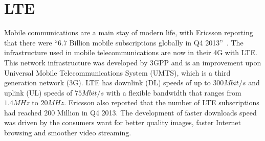 \chapter{LTE}\label{lte}
Mobile communications are a main stay of modern life, with Ericsson reporting that there were ``6.7 Billion mobile subscriptions globally in Q4 2013''~\cite{ericsson2014}. The infrastructure used in mobile telecommunications are now in their \ac{4G} with \ac{LTE}. This network infrastructure was developed by 3GPP and is an improvement upon Universal Mobile Telecommunications System (UMTS), which is a third generation network (3G). LTE has downlink (DL) speeds of up to $300 Mbit/s$ and uplink (UL) speeds of $75 Mbit/s$ with a flexible bandwidth that ranges from $1.4 MHz$ to $20 MHz$. Ericsson also reported that the number of LTE subscriptions had reached 200 Million in Q4 2013. The development of faster downloads speed was driven by the consumers want for better quality images, faster Internet browsing and smoother video streaming.~\cite{cox2012introduction}
